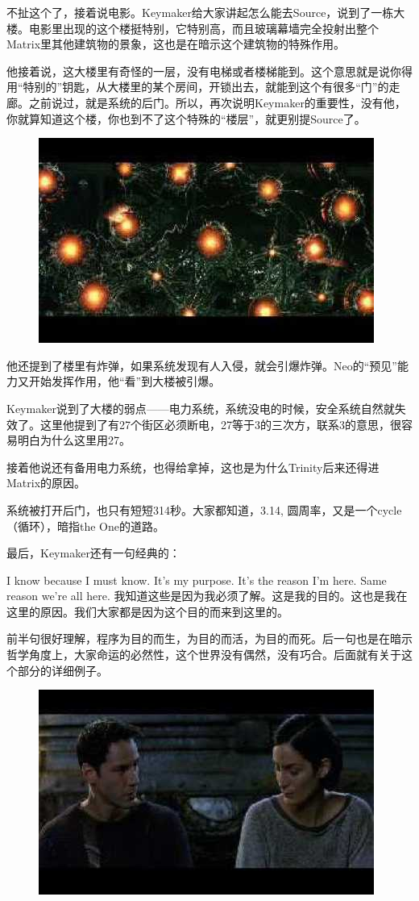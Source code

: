 \documentclass[UTF8]{ctexart}
\begin{document}
不扯这个了，接着说电影。Keymaker给大家讲起怎么能去Source，说到了一栋大楼。电影里出现的这个楼挺特别，它特别高，而且玻璃幕墙完全投射出整个Matrix里其他建筑物的景象，这也是在暗示这个建筑物的特殊作用。

他接着说，这大楼里有奇怪的一层，没有电梯或者楼梯能到。这个意思就是说你得用“特别的”钥匙，从大楼里的某个房间，开锁出去，就能到这个有很多“门”的走廊。之前说过，就是系统的后门。所以，再次说明Keymaker的重要性，没有他，你就算知道这个楼，你也到不了这个特殊的“楼层”，就更别提Source了。

\begin{figure}[htb]
\centering
\includegraphics[width=0.5\linewidth]{fig/read_reloaded-145}
\end{figure}

他还提到了楼里有炸弹，如果系统发现有人入侵，就会引爆炸弹。Neo的“预见”能力又开始发挥作用，他“看”到大楼被引爆。

Keymaker说到了大楼的弱点——电力系统，系统没电的时候，安全系统自然就失效了。这里他提到了有27个街区必须断电，27等于3的三次方，联系3的意思，很容易明白为什么这里用27。

接着他说还有备用电力系统，也得给拿掉，这也是为什么Trinity后来还得进Matrix的原因。

系统被打开后门，也只有短短314秒。大家都知道，3.14, 圆周率，又是一个cycle（循环），暗指the One的道路。

最后，Keymaker还有一句经典的：

I know because I must know. It’s my purpose. It’s the reason I’m here. Same reason we’re all here. 我知道这些是因为我必须了解。这是我的目的。这也是我在这里的原因。我们大家都是因为这个目的而来到这里的。

前半句很好理解，程序为目的而生，为目的而活，为目的而死。后一句也是在暗示哲学角度上，大家命运的必然性，这个世界没有偶然，没有巧合。后面就有关于这个部分的详细例子。

\begin{figure}[htb]
\centering
\includegraphics[width=0.5\linewidth]{fig/read_reloaded-146}
\end{figure}
\end{document}
